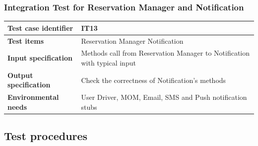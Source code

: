 \documentclass{article}
\begin{document}
			\subsubsection{Integration Test for Reservation Manager and Notification} \label{sec:3.1.11}
				\begin{minipage}{\linewidth}
				\end{minipage}
				\begin{center}
					\setlength{\tabcolsep}{24pt}
					\renewcommand{\arraystretch}{1.4}
					\begin{tabular}{ | l | p{8cm} |}\hline
						\textbf{Test case identifier} & IT13\\\hline
						\textbf{Test items} & Reservation Manager \textrightarrow Notification\\\hline
						\textbf{Input specification} & Methods call from Reservation Manager to Notification with typical input \\\hline
						\textbf{Output specification} & Check the correctness of Notification's methods \\\hline
						\textbf{Environmental needs} & User Driver, MOM, Email, SMS and Push notification stubs \\\hline
					\end{tabular}
				\end{center}
			\pagebreak
		\subsection{Test procedures}
\end{document}
